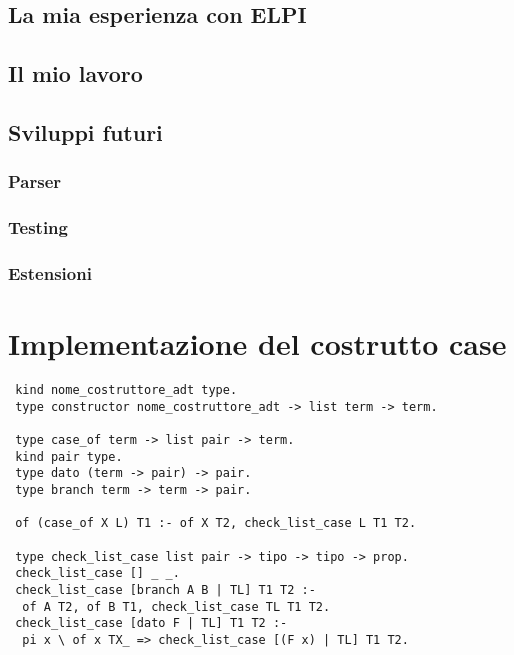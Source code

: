 \documentclass[12pt,a4paper,openright,twoside]{report}
\begin{document}
\section{La mia esperienza con ELPI}

\section{Il mio lavoro}

\section{Sviluppi futuri}
\subsection{Parser}
\subsection{Testing}
\subsection{Estensioni}

\clearpage{\pagestyle{empty}\cleardoublepage}		%


\appendix   %



\chapter{Implementazione del costrutto case}   %
\begin{verbatim}
 kind nome_costruttore_adt type.
 type constructor nome_costruttore_adt -> list term -> term.

 type case_of term -> list pair -> term.
 kind pair type.
 type dato (term -> pair) -> pair.
 type branch term -> term -> pair.

 of (case_of X L) T1 :- of X T2, check_list_case L T1 T2.

 type check_list_case list pair -> tipo -> tipo -> prop.
 check_list_case [] _ _.
 check_list_case [branch A B | TL] T1 T2 :-
  of A T2, of B T1, check_list_case TL T1 T2.
 check_list_case [dato F | TL] T1 T2 :-
  pi x \ of x TX_ => check_list_case [(F x) | TL] T1 T2.
\end{verbatim}
\end{document}
